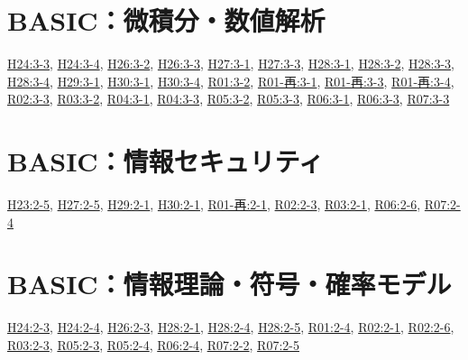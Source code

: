 \section{BASIC：微積分・数値解析}
\hyperref[q:h24-reg-basic-3-3]{H24:3-3}, \hyperref[q:h24-reg-basic-3-4]{H24:3-4}, \hyperref[q:h26-reg-basic-3-2]{H26:3-2}, \hyperref[q:h26-reg-basic-3-3]{H26:3-3}, \hyperref[q:h27-reg-basic-3-1]{H27:3-1}, \hyperref[q:h27-reg-basic-3-3]{H27:3-3}, \hyperref[q:h28-reg-basic-3-1]{H28:3-1}, \hyperref[q:h28-reg-basic-3-2]{H28:3-2}, \hyperref[q:h28-reg-basic-3-3]{H28:3-3}, \hyperref[q:h28-reg-basic-3-4]{H28:3-4}, \hyperref[q:h29-reg-basic-3-1]{H29:3-1}, \hyperref[q:h30-reg-basic-3-1]{H30:3-1}, \hyperref[q:h30-reg-basic-3-4]{H30:3-4}, \hyperref[q:r01-reg-basic-3-2]{R01:3-2}, \hyperref[q:r01-ret-basic-3-1]{R01-再:3-1}, \hyperref[q:r01-ret-basic-3-3]{R01-再:3-3}, \hyperref[q:r01-ret-basic-3-4]{R01-再:3-4}, \hyperref[q:r02-reg-basic-3-3]{R02:3-3}, \hyperref[q:r03-reg-basic-3-2]{R03:3-2}, \hyperref[q:r04-reg-basic-3-1]{R04:3-1}, \hyperref[q:r04-reg-basic-3-3]{R04:3-3}, \hyperref[q:r05-reg-basic-3-2]{R05:3-2}, \hyperref[q:r05-reg-basic-3-3]{R05:3-3}, \hyperref[q:r06-reg-basic-3-1]{R06:3-1}, \hyperref[q:r06-reg-basic-3-3]{R06:3-3}, \hyperref[q:r07-reg-basic-3-3]{R07:3-3}
\section{BASIC：情報セキュリティ}
\hyperref[q:h23-reg-basic-2-5]{H23:2-5}, \hyperref[q:h27-reg-basic-2-5]{H27:2-5}, \hyperref[q:h29-reg-basic-2-1]{H29:2-1}, \hyperref[q:h30-reg-basic-2-1]{H30:2-1}, \hyperref[q:r01-ret-basic-2-1]{R01-再:2-1}, \hyperref[q:r02-reg-basic-2-3]{R02:2-3}, \hyperref[q:r03-reg-basic-2-1]{R03:2-1}, \hyperref[q:r06-reg-basic-2-6]{R06:2-6}, \hyperref[q:r07-reg-basic-2-4]{R07:2-4}
\section{BASIC：情報理論・符号・確率モデル}
\hyperref[q:h24-reg-basic-2-3]{H24:2-3}, \hyperref[q:h24-reg-basic-2-4]{H24:2-4}, \hyperref[q:h26-reg-basic-2-3]{H26:2-3}, \hyperref[q:h28-reg-basic-2-1]{H28:2-1}, \hyperref[q:h28-reg-basic-2-4]{H28:2-4}, \hyperref[q:h28-reg-basic-2-5]{H28:2-5}, \hyperref[q:r01-reg-basic-2-4]{R01:2-4}, \hyperref[q:r02-reg-basic-2-1]{R02:2-1}, \hyperref[q:r02-reg-basic-2-6]{R02:2-6}, \hyperref[q:r03-reg-basic-2-3]{R03:2-3}, \hyperref[q:r05-reg-basic-2-3]{R05:2-3}, \hyperref[q:r05-reg-basic-2-4]{R05:2-4}, \hyperref[q:r06-reg-basic-2-4]{R06:2-4}, \hyperref[q:r07-reg-basic-2-2]{R07:2-2}, \hyperref[q:r07-reg-basic-2-5]{R07:2-5}
